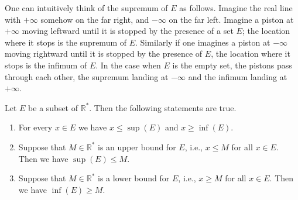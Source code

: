 \begin{note}
One can intuitively think of the supremum of \(E\) as follows.
Imagine the real line with \(+\infty\) somehow on the far right, and \(-\infty\) on the far left.
Imagine a piston at \(+\infty\) moving leftward until it is stopped by the presence of a set \(E\);
the location where it stops is the supremum of \(E\).
Similarly if one imagines a piston at \(-\infty\) moving rightward until it is stopped by the presence of \(E\), the location where it stops is the infimum of \(E\).
In the case when \(E\) is the empty set, the pistons pass through each other, the supremum landing at \(-\infty\) and the infimum landing at \(+\infty\).
\end{note}

\begin{theorem}\label{6.2.11}
Let \(E\) be a subset of \(\mathds{R}^*\).
Then the following statements are true.
\begin{enumerate}
    \item For every \(x \in E\) we have \(x \leq \sup(E)\) and \(x \geq \inf(E)\).
    \item Suppose that \(M \in \mathds{R}^*\) is an upper bound for \(E\), i.e., \(x \leq M\) for all \(x \in E\).
    Then we have \(\sup(E) \leq M\).
    \item Suppose that \(M \in \mathds{R}^*\) is a lower bound for \(E\), i.e., \(x \geq M\) for all \(x \in E\).
    Then we have \(\inf(E) \geq M\).
\end{enumerate}
\end{theorem}

